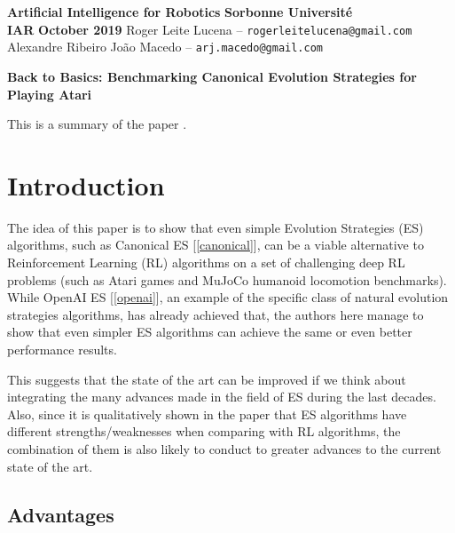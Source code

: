 \documentclass[10pt]{article} %
\begin{document}
\date{August 2018}
\noindent
\normalsize\textbf{Artificial Intelligence for Robotics} \hfill \textbf{Sorbonne Université}\\
\normalsize\textbf{IAR} \hfill \textbf{October 2019}
\flushright
{\small Roger Leite Lucena -- \texttt{rogerleitelucena@gmail.com} } \\
{\small Alexandre Ribeiro João Macedo --  \texttt{arj.macedo@gmail.com}}\vspace{20pt}
\centerline{\large \textbf{Back to Basics: Benchmarking Canonical Evolution Strategies for Playing Atari}}
\justify
\begin{center}
This is a summary of the paper \cite{DBLP:journals/corr/abs-1802-08842}.
\end{center}

\section{Introduction}

The idea of this paper is to show that even simple Evolution Strategies (ES) algorithms, such as Canonical ES [\ref{canonical}], can be a viable alternative to Reinforcement Learning (RL) algorithms on a set of challenging deep RL problems (such as Atari games and MuJoCo humanoid locomotion benchmarks). While OpenAI ES [\ref{openai}], an example of the specific class of natural evolution strategies algorithms, has already achieved that, the authors here manage to show that even simpler ES algorithms can achieve the same or even better performance results. 

This suggests that the state of the art can be improved if we think about integrating the many advances made in the field of ES during the last decades. Also, since it is qualitatively shown in the paper that ES algorithms have different strengths/weaknesses when comparing with RL algorithms, the combination of them is also likely to conduct to greater advances to the current state of the art.

\subsection{Advantages}
\end{document}
